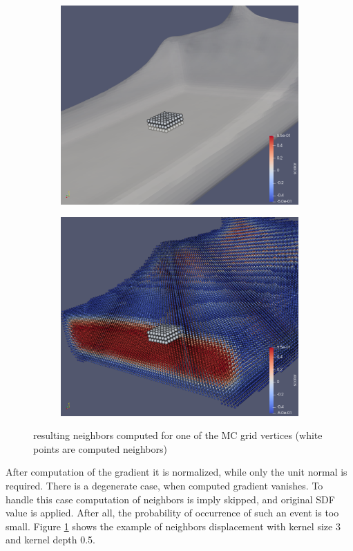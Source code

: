 \begin{figure}[H]
    \begin{subfigure}[b]{0.5\textwidth}
           \includegraphics[width=\textwidth]{figures/NeighborsComputation.png}
    \end{subfigure}
    \begin{subfigure}[b]{0.5\textwidth}
           \includegraphics[width=\textwidth]{figures/NeighborsComputation2.png}
    \end{subfigure}

    \caption{resulting neighbors computed for one of the MC grid vertices (white points are computed neighbors)}
    \label{fig:nghbrs_computation}
\end{figure}
After computation of the gradient it is normalized, while only the unit normal is required. There is a degenerate case, when computed gradient vanishes. To handle this case computation of neighbors is imply skipped, and original SDF value is applied. After all, the probability of occurrence of such an event is too small. Figure \ref{fig:nghbrs_computation} shows the example of neighbors displacement with kernel size 3 and kernel depth 0.5.

